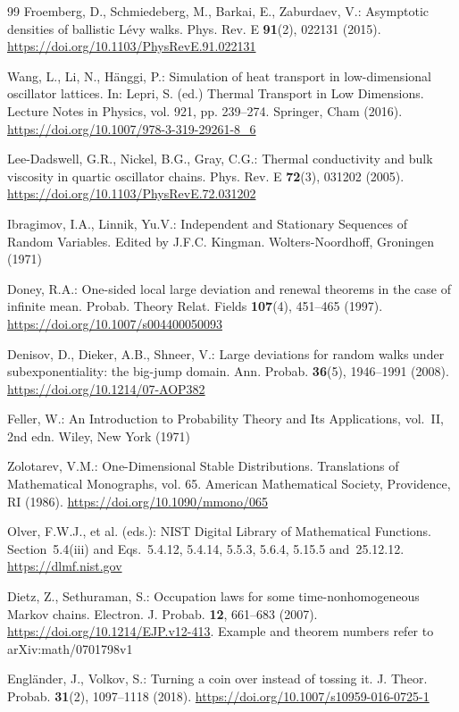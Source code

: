 \begin{thebibliography}{99}
Froemberg, D., Schmiedeberg, M., Barkai, E., Zaburdaev, V.: Asymptotic
densities of ballistic L\'evy walks. Phys. Rev. E \textbf{91}(2), 022131
(2015). \url{https://doi.org/10.1103/PhysRevE.91.022131}

Wang, L., Li, N., H\"anggi, P.: Simulation of heat transport in
low-dimensional oscillator lattices. In: Lepri, S. (ed.) Thermal Transport in
Low Dimensions. Lecture Notes in Physics, vol. 921, pp. 239--274. Springer,
Cham (2016). \url{https://doi.org/10.1007/978-3-319-29261-8_6}

Lee-Dadswell, G.R., Nickel, B.G., Gray, C.G.: Thermal conductivity and bulk
viscosity in quartic oscillator chains. Phys. Rev. E \textbf{72}(3), 031202
(2005). \url{https://doi.org/10.1103/PhysRevE.72.031202}

Ibragimov, I.A., Linnik, Yu.V.: Independent and Stationary Sequences of
Random Variables. Edited by J.F.C. Kingman. Wolters-Noordhoff, Groningen
(1971)

Doney, R.A.: One-sided local large deviation and renewal theorems in the case
of infinite mean. Probab. Theory Relat. Fields \textbf{107}(4), 451--465
(1997). \url{https://doi.org/10.1007/s004400050093}

Denisov, D., Dieker, A.B., Shneer, V.: Large deviations for random walks under
subexponentiality: the big-jump domain. Ann. Probab. \textbf{36}(5),
1946--1991 (2008). \url{https://doi.org/10.1214/07-AOP382}

Feller, W.: An Introduction to Probability Theory and Its Applications,
vol.~II, 2nd edn. Wiley, New York (1971)

Zolotarev, V.M.: One-Dimensional Stable Distributions. Translations of
Mathematical Monographs, vol. 65. American Mathematical Society, Providence,
RI (1986). \url{https://doi.org/10.1090/mmono/065}

Olver, F.W.J., et al. (eds.): NIST Digital Library of Mathematical Functions.
Section~5.4(iii) and Eqs.~5.4.12, 5.4.14, 5.5.3, 5.6.4, 5.15.5 and~25.12.12.
\url{https://dlmf.nist.gov}

Dietz, Z., Sethuraman, S.: Occupation laws for some time-nonhomogeneous
Markov chains. Electron. J. Probab. \textbf{12}, 661--683 (2007).
\url{https://doi.org/10.1214/EJP.v12-413}. Example and theorem numbers refer
to arXiv:math/0701798v1

Engl\"ander, J., Volkov, S.: Turning a coin over instead of tossing it. J.
Theor. Probab. \textbf{31}(2), 1097--1118 (2018).
\url{https://doi.org/10.1007/s10959-016-0725-1}


\end{thebibliography}
